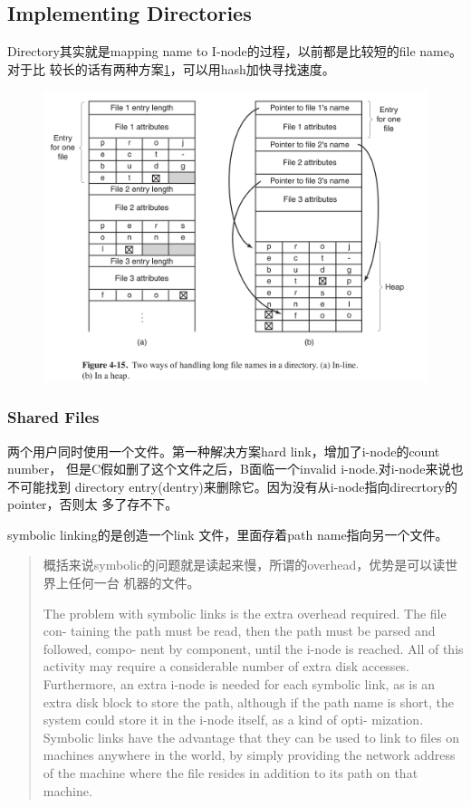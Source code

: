 \documentclass[a4paper]{article}
\begin{document}
\subsection{Implementing Directories}
Directory其实就是mapping name to I-node的过程，以前都是比较短的file name。对于比
较长的话有两种方案\ref{longfilename}，可以用hash加快寻找速度。

\begin{figure}
  \centering
  \includegraphics{longfilename.png}
  \caption{}
  \label{longfilename}
\end{figure}

\subsubsection{Shared Files}
两个用户同时使用一个文件。第一种解决方案hard link，增加了i-node的count number，
但是C假如删了这个文件之后，B面临一个invalid i-node.对i-node来说也不可能找到
directory entry(dentry)来删除它。因为没有从i-node指向direcrtory的pointer，否则太
多了存不下。

symbolic linking的是创造一个link 文件，里面存着path name指向另一个文件。

\begin{quote}
  概括来说symbolic的问题就是读起来慢，所谓的overhead，优势是可以读世界上任何一台
  机器的文件。

  The problem with symbolic links is the extra overhead required. The file con-
taining the path must be read, then the path must be parsed and followed, compo-
nent by component, until the i-node is reached. All of this activity may require a
considerable number of extra disk accesses. Furthermore, an extra i-node is needed
for each symbolic link, as is an extra disk block to store the path, although if the
path name is short, the system could store it in the i-node itself, as a kind of opti-
mization. Symbolic links have the advantage that they can be used to link to files
on machines anywhere in the world, by simply providing the network address of
the machine where the file resides in addition to its path on that machine.
\end{quote}
\end{document}
